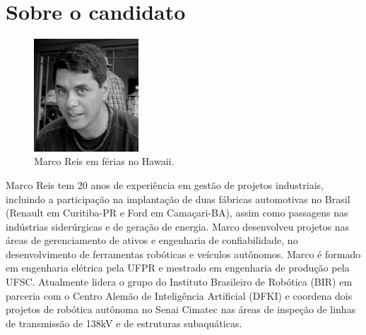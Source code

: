\setcounter{equation}{0}
\chapter{Sobre o candidato}
	\begin{figure}[h!]													%
  		\centering														%
   			 \includegraphics[width=0.35\textwidth]{./marco}			%
 		 \caption{Marco Reis em férias no Hawaii.}					%
	\end{figure}														%

Marco Reis tem 20 anos de experiência em gestão de projetos industriais, incluindo a participação na implantação de duas fábricas automotivas no Brasil (Renault em Curitiba-PR e Ford em Camaçari-BA), assim como passagens nas indústrias siderúrgicas e de geração de energia. Marco desenvolveu projetos nas áreas de gerenciamento de ativos e engenharia de confiabilidade, no desenvolvimento de ferramentas robóticas e veículos autônomos. Marco é formado em engenharia elétrica pela UFPR e mestrado em engenharia de produção pela UFSC. Atualmente lidera o grupo do Instituto Brasileiro de Robótica (BIR) em parceria com o Centro Alemão de Inteligência Artificial (DFKI) e coordena dois projetos de robótica autônoma no Senai Cimatec nas áreas de inspeção de linhas de transmissão de 138kV e de estruturas subaquáticas.
